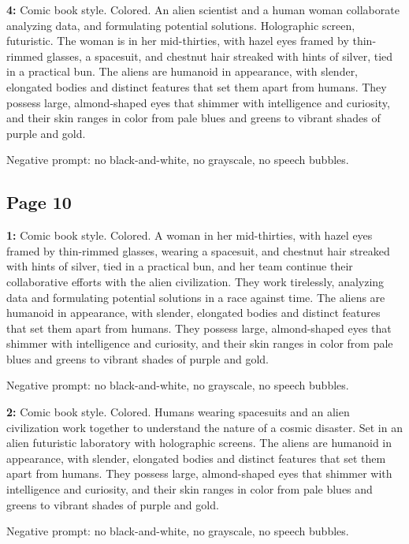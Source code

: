 \begin{iquote}
    \textbf{4:} Comic book style. Colored. An alien scientist and a human woman collaborate analyzing data, and formulating potential solutions. Holographic screen, futuristic. The woman is in her mid-thirties, with hazel eyes framed by thin-rimmed glasses, a spacesuit, and chestnut hair streaked with hints of silver, tied in a practical bun. The aliens are humanoid in appearance, with slender, elongated bodies and distinct features that set them apart from humans. They possess large, almond-shaped eyes that shimmer with intelligence and curiosity, and their skin ranges in color from pale blues and greens to vibrant shades of purple and gold. 

    \noindent Negative prompt: no black-and-white, no grayscale, no speech bubbles.
\end{iquote}


\subsection*{Page 10}
\begin{iquote}
    \textbf{1:} Comic book style. Colored. A woman in her mid-thirties, with hazel eyes framed by thin-rimmed glasses, wearing a spacesuit, and chestnut hair streaked with hints of silver, tied in a practical bun, and her team continue their collaborative efforts with the alien civilization. They work tirelessly, analyzing data and formulating potential solutions in a race against time. The aliens are humanoid in appearance, with slender, elongated bodies and distinct features that set them apart from humans. They possess large, almond-shaped eyes that shimmer with intelligence and curiosity, and their skin ranges in color from pale blues and greens to vibrant shades of purple and gold.

    \noindent Negative prompt: no black-and-white, no grayscale, no speech bubbles.
\end{iquote}

\begin{iquote}
    \textbf{2:} Comic book style. Colored. Humans wearing spacesuits and an alien civilization work together to understand the nature of a cosmic disaster. Set in an alien futuristic laboratory with holographic screens. The aliens are humanoid in appearance, with slender, elongated bodies and distinct features that set them apart from humans. They possess large, almond-shaped eyes that shimmer with intelligence and curiosity, and their skin ranges in color from pale blues and greens to vibrant shades of purple and gold.

    \noindent Negative prompt: no black-and-white, no grayscale, no speech bubbles.
\end{iquote}

